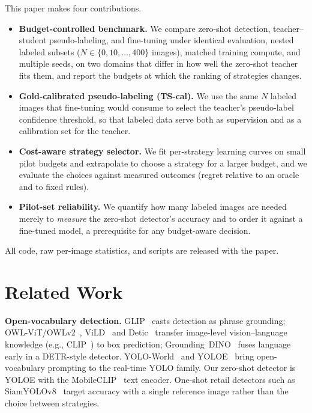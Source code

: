 \documentclass[conference]{IEEEtran}
\begin{document}
This paper makes four contributions.
\begin{itemize}
\item \textbf{Budget-controlled benchmark.} We compare zero-shot detection, teacher--student pseudo-labeling, and fine-tuning under identical evaluation, nested labeled subsets ($N\in\{0,10,\dots,400\}$ images), matched training compute, and multiple seeds, on two domains that differ in how well the zero-shot teacher fits them, and report the budgets at which the ranking of strategies changes.
\item \textbf{Gold-calibrated pseudo-labeling (TS-cal).} We use the same $N$ labeled images that fine-tuning would consume to select the teacher's pseudo-label confidence threshold, so that labeled data serve both as supervision and as a calibration set for the teacher.
\item \textbf{Cost-aware strategy selector.} We fit per-strategy learning curves on small pilot budgets and extrapolate to choose a strategy for a larger budget, and we evaluate the choices against measured outcomes (regret relative to an oracle and to fixed rules).
\item \textbf{Pilot-set reliability.} We quantify how many labeled images are needed merely to \emph{measure} the zero-shot detector's accuracy and to order it against a fine-tuned model, a prerequisite for any budget-aware decision.
\end{itemize}
All code, raw per-image statistics, and scripts are released with the paper.

\section{Related Work}
\textbf{Open-vocabulary detection.} GLIP~\cite{li2022glip} casts detection as phrase grounding; OWL-ViT/OWLv2~\cite{minderer2022owlvit,minderer2023owlv2}, ViLD~\cite{gu2022vild} and Detic~\cite{zhou2022detic} transfer image-level vision--language knowledge (e.g., CLIP~\cite{radford2021clip}) to box prediction; Grounding~DINO~\cite{liu2024groundingdino} fuses language early in a DETR-style detector. YOLO-World~\cite{cheng2024yoloworld} and YOLOE~\cite{wang2025yoloe} bring open-vocabulary prompting to the real-time YOLO family. Our zero-shot detector is YOLOE with the MobileCLIP~\cite{vasu2024mobileclip} text encoder. One-shot retail detectors such as SiamYOLOv8~\cite{desmarescaux2025siamyolov8} target accuracy with a single reference image rather than the choice between strategies.
\end{document}
